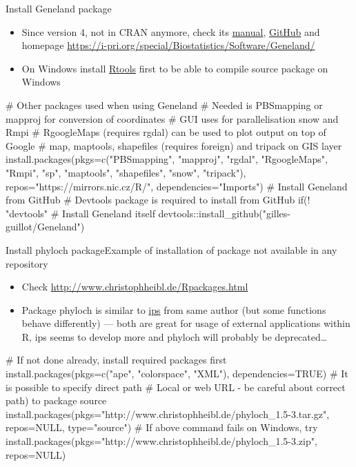 \documentclass[compress, ucs, xelatex, 11pt, xcolor=svgnames, aspectratio=169,
	hyperref={
		bookmarks=true,
		unicode=true,
		colorlinks=true,
		pdftitle={Molecular data in R},
		plainpages=false,
		pdfauthor={Vojtech Zeisek},
		pdfsubject={Course about phylogeny and evolution in R},
		pdfcreator={XeLaTeX},
		pdfkeywords={R, evolution, phylogeny, molecular data},
		linkcolor=Crimson, %
		anchorcolor=Magenta, %
		citecolor=Magenta, %
		filecolor=Magenta, %
		menucolor=Magenta, %
		urlcolor=DodgerBlue, %
		pdftex},
	url={hyphens, lowtilde} %
	]{beamer}
\begin{document}
\begin{frame}[fragile]{Install Geneland package}
	\label{Geneland}
	\begin{itemize}
		\item Since version 4, not in CRAN anymore, check its \href{https://i-pri.org/special/Biostatistics/Software/Geneland/Geneland-Doc.pdf}{manual}, \href{https://github.com/gilles-guillot/Geneland}{GitHub} and homepage \url{https://i-pri.org/special/Biostatistics/Software/Geneland/}
		\item On Windows install \href{https://cran.r-project.org/bin/windows/Rtools/}{Rtools} first to be able to compile source package on Windows
	\end{itemize}
	\begin{spluscode}
    # Other packages used when using Geneland
    # Needed is PBSmapping or mapproj for conversion of coordinates
    # GUI uses for parallelisation snow and Rmpi
    # RgoogleMaps (requires rgdal) can be used to plot output on top of Google
    # map, maptools, shapefiles (requires foreign) and tripack on GIS layer
    install.packages(pkgs=c("PBSmapping", "mapproj", "rgdal", "RgoogleMaps",
      "Rmpi", "sp", "maptools", "shapefiles", "snow", "tripack"),
      repos="https://mirrors.nic.cz/R/", dependencies="Imports")
    # Install Geneland from GitHub
    # Devtools package is required to install from GitHub
    if(! "devtools" %
    # Install Geneland itself
    devtools::install_github("gilles-guillot/Geneland")
	\end{spluscode}
\end{frame}

\begin{frame}[fragile]{Install phyloch package}{Example of installation of package not available in any repository}
	\label{phyloch}
	\begin{itemize}
		\item Check \url{http://www.christophheibl.de/Rpackages.html}
		\item Package phyloch is similar to \href{https://CRAN.R-project.org/package=ips}{ips} from same author (but some functions behave differently) --- both are great for usage of external applications within R, ips seems to develop more and phyloch will probably be deprecated\ldots
	\end{itemize}
	\begin{spluscode}
    # If not done already, install required packages first
    install.packages(pkgs=c("ape", "colorspace", "XML"), dependencies=TRUE)
    # It is possible to specify direct path
    # Local or web URL - be careful about correct path) to package source
    install.packages(pkgs="http://www.christophheibl.de/phyloch_1.5-3.tar.gz",
      repos=NULL, type="source")
    # If above command fails on Windows, try
    install.packages(pkgs="http://www.christophheibl.de/phyloch_1.5-3.zip",
      repos=NULL)
	\end{spluscode}
\end{frame}
\end{document}
